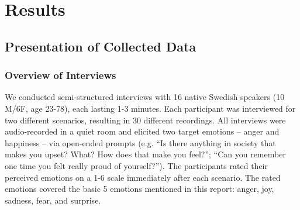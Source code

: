 \chapter{Results}
\label{sec:results}


\section{Presentation of Collected Data}
\subsection{Overview of Interviews}
We conducted semi-structured interviews with 16 native Swedish speakers (10 M/6F, age 23-78), each lasting 1-3 minutes. Each participant was interviewed for two different scenarios, resulting in 30 different recordings. All interviews were audio-recorded in a quiet room and elicited two target emotions – anger and happiness – via open-ended prompts (e.g. “Is there anything in society that makes you upset? What? How does that make you feel?”; “Can you remember one time you felt really proud of yourself?”). The participants rated their perceived emotions on a 1-6 scale immediately after each scenario. The rated emotions covered the basic 5 emotions mentioned in this report: anger, joy, sadness, fear, and surprise. 


